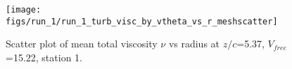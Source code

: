\begin{figure}[H]
\centering
\texttt{[image: figs/run\_1/run\_1\_turb\_visc\_by\_vtheta\_vs\_r\_meshscatter]}
\caption{Scatter plot of mean total viscosity $\nu$ vs radius at $z/c$=5.37, $V_{free}$=15.22, station 1.}
\label{fig:run_1_turb_visc_by_vtheta_vs_r_meshscatter}
\end{figure}


